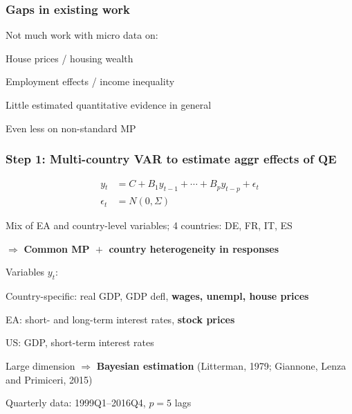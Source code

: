 \documentclass[pdflatex,aspectratio=169]{beamer}
\newcommand{\jemph}[1]{{\color{StataDarkBlue}#1}}
\newcommand{\jbemph}[1]{\textbf{\color{SlideNavy}#1}}
\begin{document}
\begin{frame}\frametitle{\bf Gaps in existing work }
Not much work with micro data on:\\
\bi
\setlength{\itemsep}{2mm}
\item House prices / housing wealth
\item Employment effects / income inequality
\item Little estimated quantitative evidence in general
\item Even less on non-standard MP
\ei

\end{frame}


\begin{frame}\frametitle{\bf\large Step 1: Multi-country VAR to estimate aggr effects of QE}

\vspace*{-11.5mm}
\begin{align*}
y{_t}&=C+B{_1}  y_{t-1}+\cdots+B{_p}  y_{t-p}+\epsilon_{t}\\
\epsilon_{t}&=N(0,\Sigma)
\end{align*}
\vspace*{-7.5mm}
\bi
\setlength{\itemsep}{2mm}
\item Mix of EA and country-level variables; \jemph{4 countries: DE, FR, IT, ES}
\item $\Rightarrow$ \jbemph{Common MP ${}+{}$ country heterogeneity in responses}
\item Variables $y_t$:
\bi
\item \jemph{Country-specific:} real GDP, GDP defl, \jbemph{wages, unempl, house prices}
\item \jemph{EA:} short- and long-term interest rates, \jbemph{stock prices}
\item \jemph{US:} GDP, short-term interest rates
\ei
\item Large dimension $\Rightarrow$ \jbemph{Bayesian estimation} (Litterman, 1979; Giannone, Lenza and Primiceri, 2015)
\item Quarterly data: 1999Q1--2016Q4, $p=5$ lags
\ei
\end{frame}
\end{document}
